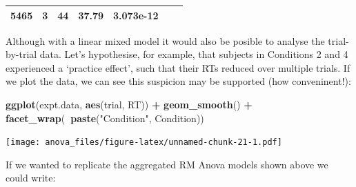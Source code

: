 \documentclass[]{article}
\newenvironment{Shaded}{\begin{snugshade}}{\end{snugshade}}
\newcommand{\KeywordTok}[1]{\textcolor[rgb]{0.13,0.29,0.53}{\textbf{#1}}}
\newcommand{\StringTok}[1]{\textcolor[rgb]{0.31,0.60,0.02}{#1}}
\newcommand{\OperatorTok}[1]{\textcolor[rgb]{0.81,0.36,0.00}{\textbf{#1}}}
\newcommand{\NormalTok}[1]{#1}
\theoremstyle{definition}
\theoremstyle{definition}
\theoremstyle{definition}
\theoremstyle{remark}
\begin{document}
\begin{longtable}[]{@{}ccccccc@{}}
\begin{minipage}[t]{0.10\columnwidth}
5465\strut
\end{minipage} & \begin{minipage}[t]{0.08\columnwidth}\centering\strut
3\strut
\end{minipage} & \begin{minipage}[t]{0.08\columnwidth}\centering\strut
44\strut
\end{minipage} & \begin{minipage}[t]{0.10\columnwidth}\centering\strut
37.79\strut
\end{minipage} & \begin{minipage}[t]{0.12\columnwidth}\centering\strut
3.073e-12\strut
\end{minipage}\tabularnewline
\bottomrule
\end{longtable}

Although with a linear mixed model it would also be posible to analyse
the trial-by-trial data. Let's hypothesise, for example, that subjects
in Conditions 2 and 4 experienced a `practice effect', such that their
RTs reduced over multiple trials. If we plot the data, we can see this
suspicion may be supported (how conveninent!):

\begin{Shaded}
\begin{Highlighting}[]
\KeywordTok{ggplot}\NormalTok{(expt.data, }
  \KeywordTok{aes}\NormalTok{(trial, RT)) }\OperatorTok{+}\StringTok{ }
\StringTok{  }\KeywordTok{geom_smooth}\NormalTok{() }\OperatorTok{+}\StringTok{ }
\StringTok{  }\KeywordTok{facet_wrap}\NormalTok{(}\OperatorTok{~}\KeywordTok{paste}\NormalTok{(}\StringTok{"Condition"}\NormalTok{, Condition))}
\end{Highlighting}
\end{Shaded}

\texttt{[image: anova\_files/figure-latex/unnamed-chunk-21-1.pdf]}

If we wanted to replicate the aggregated RM Anova models shown above we
could write:
\end{document}
